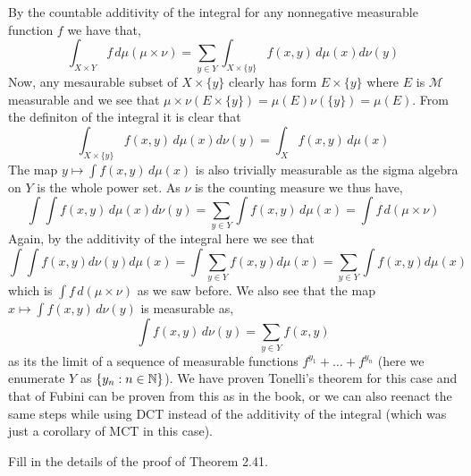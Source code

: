 \documentclass[12pt,a4paper]{article}
\begin{document}
\begin{solution}
    By the countable additivity of the integral for any nonnegative measurable function $f$ we have that,
	\[
		\int_{X\times Y}f\,d\mu(\mu\times\nu)=\sum_{y\in Y}\int_{X\times\{y\}}f(x,y)\,d\mu(x)d\nu(y)
	\]
	Now, any mesaurable subset of $X\times\{y\}$ clearly has form $E\times\{y\}$ where $E$ is $\mathcal M$ measurable and we see that  $\mu\times\nu(E\times\{y\})=\mu(E)\nu(\{y\})=\mu(E)$. 
	From the definiton of the integral it is clear that
	\[
		\int_{X\times\{y\}}f(x,y)\,d\mu(x)d\nu(y)=\int_Xf(x,y)\,d\mu(x)
	\]
	The map $y\mapsto\int f(x,y)\,d\mu(x)$ is also trivially measurable as the sigma algebra on $Y$ is the whole power set. 
	As $\nu$ is the counting measure we thus have,
	\[
		\int\int f(x,y)\,d\mu(x)d\nu(y)=\sum_{y\in Y}\int f(x,y)\,d\mu(x)=\int f\,d(\mu\times\nu)   
	\]
	Again, by the additivity of the integral here we see that
	\[
		\int\int f(x,y)d\nu(y)d\mu(x)=\int\sum_{y\in Y}f(x,y)d\mu(x)=\sum_{y\in Y}\int f(x,y)d\mu(x)
	\]
	which is $\int f\,d(\mu\times\nu)$ as we saw before. 
	We also see that the map $x\mapsto\int f(x,y)\,d\nu(y)$ is measurable as,
	\[
		\int f(x,y)\,d\nu(y)=\sum_{y\in Y}f(x,y)
	\]
	as its the limit of a sequence of measurable functions $f^{y_1}+\ldots+f^{y_n}$ (here we enumerate $Y$ as $\{y_n:n\in\mathbb{N}\}$). 
	We have proven Tonelli's theorem for this case and that of Fubini can be proven from this as in the book, or we can also reenact the same steps while using DCT instead of the additivity of the integral (which was just a corollary of MCT in this case).
\end{solution}
\begin{problem}\label{prob:2-53}
Fill in the details of the proof of Theorem 2.41.
\end{problem}
\end{document}
